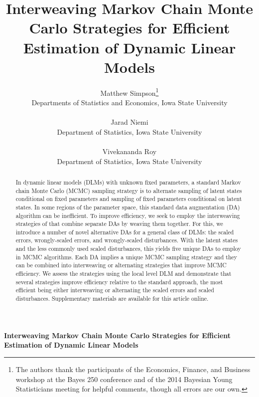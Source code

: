 \documentclass[12pt]{article}
\begin{document}
\def\spacingset#1{\renewcommand{\baselinestretch}%
{#1}\small\normalsize} \spacingset{1}
\setlength{\tabcolsep}{2pt}

\blind
{
  \title{\bf Interweaving Markov Chain Monte Carlo Strategies for Efficient
    Estimation of Dynamic Linear Models}
  \author{Matthew Simpson\thanks{
    The authors thank the participants of the Economics, Finance, and Business workshop at the Bayes 250 conference and of the 2014 Bayesian Young Statisticians meeting for helpful comments, though all errors are our own.}\hspace{.2cm}\\
    Departments of Statistics and Economics, Iowa State University\\~\\
    Jarad Niemi \\
    Department of Statistics, Iowa State University\\~\\
    Vivekananda Roy\\
    Department of Statistics, Iowa State University}
  \maketitle
} \fi

\blind
{
  \bigskip
  \bigskip
  \bigskip
  \begin{center}
    {\LARGE\bf Interweaving Markov Chain Monte Carlo Strategies for Efficient
    Estimation of Dynamic Linear Models}
\end{center}
  \medskip
} \fi

\bigskip


\begin{abstract}
In dynamic linear models (DLMs) with unknown fixed parameters, a standard Markov chain Monte Carlo (MCMC) sampling strategy is to alternate sampling of latent states conditional on fixed parameters and sampling of fixed parameters conditional on latent states. In some regions of the parameter space, this standard data augmentation (DA) algorithm can be inefficient. To improve efficiency, we seek to employ the interweaving strategies of \citet{yu2011center} that combine separate DAs by weaving them together. For this, we introduce a number of novel alternative DAs for a general class of DLMs: the scaled errors, wrongly-scaled errors, and wrongly-scaled disturbances. With the latent states and the less commonly used scaled disturbances, this yields five unique DAs to employ in MCMC algorithms. Each DA implies a unique MCMC sampling strategy and they can be combined into interweaving or alternating strategies that improve MCMC efficiency. We assess the strategies using the local level DLM and demonstrate that several strategies improve efficiency relative to the standard approach, the most efficient being either interweaving or alternating the scaled errors and scaled disturbances. Supplementary materials are available for this article online.
\end{abstract}
\end{document}
